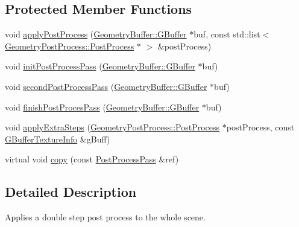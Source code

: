 \subsection*{Protected Member Functions}
\begin{DoxyCompactItemize}
\item 
void \mbox{\hyperlink{class_geometry_engine_1_1_geometry_render_step_1_1_post_process_pass_ac0f109e5dc7fb598c2613daaff285526}{apply\+Post\+Process}} (\mbox{\hyperlink{class_geometry_engine_1_1_geometry_buffer_1_1_g_buffer}{Geometry\+Buffer\+::\+G\+Buffer}} $\ast$buf, const std\+::list$<$ \mbox{\hyperlink{class_geometry_engine_1_1_geometry_post_process_1_1_post_process}{Geometry\+Post\+Process\+::\+Post\+Process}} $\ast$ $>$ \&post\+Process)
\item 
void \mbox{\hyperlink{class_geometry_engine_1_1_geometry_render_step_1_1_post_process_pass_ae0bfafe4123decb5eb65e1decc3c07ba}{init\+Post\+Process\+Pass}} (\mbox{\hyperlink{class_geometry_engine_1_1_geometry_buffer_1_1_g_buffer}{Geometry\+Buffer\+::\+G\+Buffer}} $\ast$buf)
\item 
void \mbox{\hyperlink{class_geometry_engine_1_1_geometry_render_step_1_1_post_process_pass_a3d555943a9bc2b3105e71b8984b1ce0b}{second\+Post\+Process\+Pass}} (\mbox{\hyperlink{class_geometry_engine_1_1_geometry_buffer_1_1_g_buffer}{Geometry\+Buffer\+::\+G\+Buffer}} $\ast$buf)
\item 
void \mbox{\hyperlink{class_geometry_engine_1_1_geometry_render_step_1_1_post_process_pass_abfc2e269aad1157916f6c3c72b570ae9}{finish\+Post\+Proces\+Pass}} (\mbox{\hyperlink{class_geometry_engine_1_1_geometry_buffer_1_1_g_buffer}{Geometry\+Buffer\+::\+G\+Buffer}} $\ast$buf)
\item 
void \mbox{\hyperlink{class_geometry_engine_1_1_geometry_render_step_1_1_post_process_pass_ad13ce012b043f2c7b9305d42d43ba9c8}{apply\+Extra\+Steps}} (\mbox{\hyperlink{class_geometry_engine_1_1_geometry_post_process_1_1_post_process}{Geometry\+Post\+Process\+::\+Post\+Process}} $\ast$post\+Process, const \mbox{\hyperlink{class_geometry_engine_1_1_g_buffer_texture_info}{G\+Buffer\+Texture\+Info}} \&g\+Buff)
\item 
virtual void \mbox{\hyperlink{class_geometry_engine_1_1_geometry_render_step_1_1_post_process_pass_a5279399395c18ac4ef35fa3028aa4950}{copy}} (const \mbox{\hyperlink{class_geometry_engine_1_1_geometry_render_step_1_1_post_process_pass}{Post\+Process\+Pass}} \&ref)
\end{DoxyCompactItemize}


\subsection{Detailed Description}
Applies a double step post process to the whole scene. 

